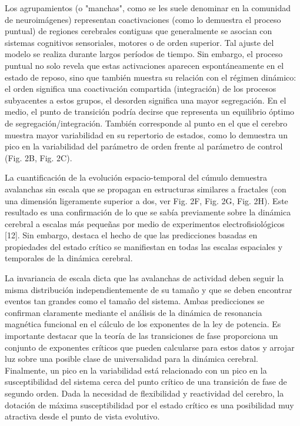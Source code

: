 Los agrupamientos (o "manchas", como se les suele denominar en la comunidad de neuroimágenes) representan coactivaciones (como lo demuestra el proceso puntual) de regiones cerebrales contiguas que generalmente se asocian con sistemas cognitivos sensoriales, motores o de orden superior. Tal ajuste del modelo se realiza durante largos períodos de tiempo. Sin embargo, el proceso puntual no solo revela que estas activaciones aparecen espontáneamente en el estado de reposo, sino que también muestra su relación con el régimen dinámico: el orden significa una coactivación compartida (integración) de los procesos subyacentes a estos grupos, el desorden significa una mayor segregación. En el medio, el punto de transición podría decirse que representa un equilibrio óptimo de segregación/integración. También corresponde al punto en el que el cerebro muestra mayor variabilidad en su repertorio de estados, como lo demuestra un pico en la variabilidad del parámetro de orden frente al parámetro de control (Fig. 2B, Fig. 2C).

La cuantificación de la evolución espacio-temporal del cúmulo demuestra avalanchas sin escala que se propagan en estructuras similares a fractales (con una dimensión ligeramente superior a dos, ver Fig. 2F, Fig. 2G, Fig. 2H). Este resultado es una confirmación de lo que se sabía previamente sobre la dinámica cerebral a escalas más pequeñas por medio de experimentos electrofisiológicos [12]. Sin embargo, destaca el hecho de que las predicciones basadas en propiedades del estado crítico se manifiestan en todas las escalas espaciales y temporales de la dinámica cerebral.


La invariancia de escala dicta que las avalanchas de actividad deben seguir la misma distribución independientemente de su tamaño y que se deben encontrar eventos tan grandes como el tamaño del sistema. Ambas predicciones se confirman claramente mediante el análisis de la dinámica de resonancia magnética funcional en el cálculo de los exponentes de la ley de potencia. Es importante destacar que la teoría de las transiciones de fase proporciona un conjunto de exponentes críticos que pueden calcularse para estos datos y arrojar luz sobre una posible clase de universalidad para la dinámica cerebral. Finalmente, un pico en la variabilidad está relacionado con un pico en la susceptibilidad del sistema cerca del punto crítico de una transición de fase de segundo orden.  Dada la necesidad de flexibilidad y reactividad del cerebro, la dotación de máxima susceptibilidad por el estado crítico es una posibilidad muy atractiva desde el punto de vista evolutivo.


